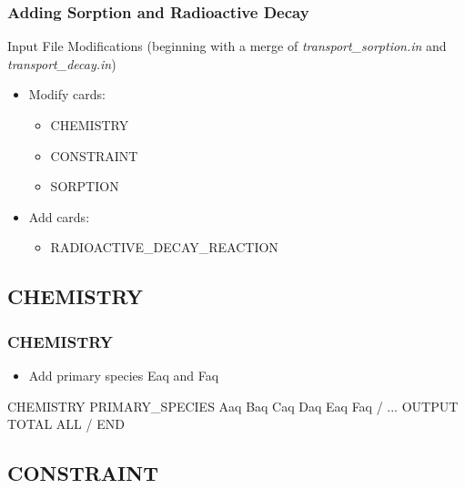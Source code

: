 \documentclass{beamer}
\newcommand\magentacomment[1]{{{\color{magenta} #1}}}
\begin{document}
\begin{frame}[fragile]\frametitle{Adding Sorption and Radioactive Decay}

Input File Modifications (beginning with a merge of \textit{transport\_sorption.in} and \textit{transport\_decay.in})
\begin{itemize}
\item Modify cards:
  \begin{itemize}
    \item CHEMISTRY
    \item CONSTRAINT
    \item SORPTION
   \end{itemize}
\item Add cards:
  \begin{itemize}
    \item RADIOACTIVE\_DECAY\_REACTION
  \end{itemize}
\end{itemize}

\end{frame}

\subsection{CHEMISTRY}

\begin{frame}[fragile]\frametitle{CHEMISTRY}

\begin{itemize}
  \item Add primary species Eaq and Faq
\end{itemize}

\begin{semiverbatim}
CHEMISTRY
  PRIMARY_SPECIES
    Aaq
    Baq
    Caq
    Daq
    \magentacomment{Eaq}
    \magentacomment{Faq}
  /
  ...
  OUTPUT
    TOTAL
    ALL
  /
END
\end{semiverbatim}

\end{frame}

\subsection{CONSTRAINT}
\end{document}
